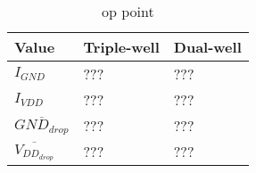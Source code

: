 
\begin{table}[H]
	\label{tab_op}
	\centering
	\begin{tabular}{lll}
		Value  & Triple-well & Dual-well \\ \hline
		$I_{GND}$                                & ???          & ???   \\
		$I_{VDD}$                                 & ???        & ???       \\
		$\overline{GND_{drop}}$      & ???         & ???      \\
		$\overline{V_{DD_{drop}}}$  & ???         & ???       
	\end{tabular}
	\caption{op point}
\end{table}
